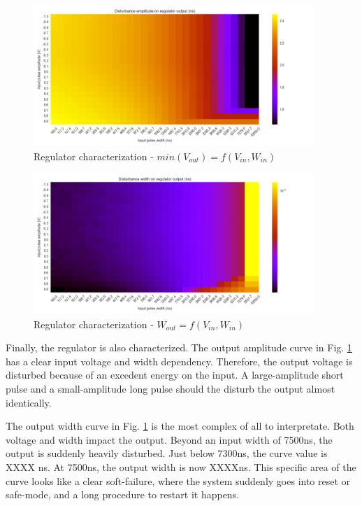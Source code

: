 \begin{figure}[!htb]
  \centering
  \includegraphics[width=0.95\textwidth]{src/4/figures/regulator_cz_V2_amplitude.png}
  \caption{Regulator characterization - $min(V_{out}) = f(V_{in}, W_{in})$}
  \label{fig:reg-cz-v2-amp}
\end{figure}

\begin{figure}[!htb]
  \centering
  \includegraphics[width=0.95\textwidth]{src/4/figures/regulator_cz_V2_width.png}
  \caption{Regulator characterization - $W_{out} = f(V_{in}, W_{in})$}
  \label{fig:reg-cz-v2-width}
\end{figure}

Finally, the regulator is also characterized.
The output amplitude curve in Fig. \ref{fig:reg-cz-v2-amp} has a clear input voltage and width dependency.
Therefore, the output voltage is disturbed because of an excedent energy on the input.
A large-amplitude short pulse and a small-amplitude long pulse should the disturb the output almost identically.

The output width curve in Fig. \ref{fig:reg-cz-v2-amp} is the most complex of all to interpretate.
Both voltage and width impact the output.
Beyond an input width of 7500ns, the output is suddenly heavily disturbed.
Just below 7300ns, the curve value is XXXX ns.
At 7500ns, the output width is now XXXXns.
This specific area of the curve looks like a clear soft-failure, where the system suddenly goes into reset or safe-mode, and a long procedure to restart it happens.


